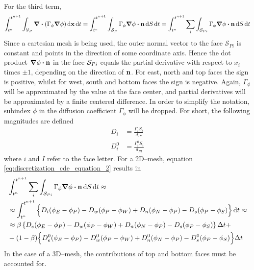 For the third term,
\begin{equation} \label{eq:discretization_cde_equation_2}
	\int_{t^n}^{t^{n+1}} \int_{\cv{P}} \div(\Gamma_\phi \grad{\phi}) \dd{\vb{x}} \dd{t} = 
	\int_{t^n}^{t^{n+1}} \int_{\cs{P}} \Gamma_\phi \grad{\phi} \vdot \vb{n} \dd{S} \dd{t} = 
	\int_{t^n}^{t^{n+1}} \sum_i \int_{\cs{Pi}} \Gamma_\phi \grad{\phi} \vdot \vb{n} \dd{S} \dd{t}
\end{equation}
Since a cartesian mesh is being used, the outer normal vector to the face $\mathcal{S}_{Pi}$ is constant and points in the direction of some coordinate axis. Hence the dot product $\grad{\phi} \vdot \vb{n}$ in the face $\mathcal{S}_{Pi}$ equals the partial derivative with respect to $x_i$ times $\pm 1$, depending on the direction of $\vb{n}$. For east, north and top faces the sign is positive, whilst for west, south and bottom faces the sign is negative. Again, $\Gamma_\phi$ will be approximated by the value at the face center, and partial derivatives will be approximated by a finite centered difference. In order to simplify the notation, subindex $\phi$ in the diffusion coefficient $\Gamma_\phi$ will be dropped. For short, the following magnitudes are defined
\begin{align}
	D_i &= \frac{\Gamma_i S_i}{d_{PI}} \\
	D_i^0 &= \frac{\Gamma_i^0 S_i}{d_{PI}}
\end{align}
where $i$ and $I$ refer to the face letter. For a 2D--mesh, equation \eqref{eq:discretization_cde_equation_2} results in
\begin{align}
	&\int_{t^n}^{t^{n+1}} \sum_i \int_{\cs{Pi}} \Gamma_\phi \grad{\phi} \vdot \vb{n} \dd{S} \dd{t} 
	\approx \nonumber \\ 
	&\approx 
	\int_{t^n}^{t^{n+1}}
	\Big\{ 
	D_i (\phi_E - \phi_P) - D_w (\phi_P - \phi_W) + D_n (\phi_N - \phi_P) - D_s (\phi_P - \phi_S) 
	\Big\} \dd{t} \approx \nonumber \\
	&\approx
	\beta 
	\left\{ 
		D_e (\phi_E - \phi_P) - D_w (\phi_P - \phi_W) + D_n (\phi_N - \phi_P) - D_s (\phi_P - \phi_S) 
	\right\} \Delta t + \nonumber \\
	&+ (1 - \beta)
	\Big\{ 
		D_e^0 (\phi_E - \phi_P) - D_w^0 (\phi_P - \phi_W) + D_n^0 (\phi_N - \phi_P) - D_s^0 (\phi_P - \phi_S) 
	\Big\} \Delta t
\end{align}
In the case of a 3D--mesh, the contributions of top and bottom faces must be accounted for.

